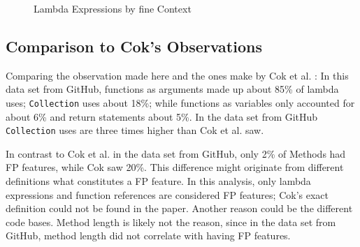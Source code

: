 \documentclass[11pt]{article}
\newcommand{\code}[1]{\texttt{#1}}
\begin{document}
\begin{appendices}
\begin{figure}[H]
	\caption{Lambda Expressions by fine Context}
	\label{fig:fine_category}
\end{figure}



\subsection{Comparison to Cok's Observations}

Comparing the observation made here and the ones make by Cok et al. :
In this data set from GitHub, functions as arguments made up about 85\% of lambda uses; \code{Collection} uses about 18\%; while functions as variables only accounted for about 6\% and return statements about 5\%.
In the data set from GitHub \code{Collection} uses are three times higher than Cok et al. saw.

In contrast to Cok et al. in the data set from GitHub, only 2\% of Methods had FP features, while Cok saw 20\%. This difference might originate from different definitions what constitutes a FP feature. In this analysis, only lambda expressions and function references are considered FP features; Cok's exact definition could not be found in the paper. Another reason could be the different code bases.
Method length is likely not the reason, since in the data set from GitHub, method length did not correlate with having FP features.
\end{appendices}


\printbibliography
\end{document}
